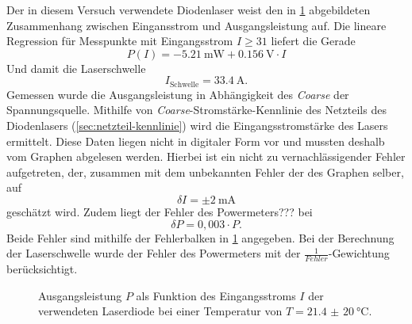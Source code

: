 \documentclass[../bericht.tex]{subfiles}
\begin{document}
      Der in diesem Versuch verwendete Diodenlaser weist den in \cref{fig:laserschwelle} abgebildeten Zusammenhang zwischen Eingansstrom und Ausgangsleistung auf. Die lineare Regression für Messpunkte mit Eingangsstrom $I\ge 31$ liefert die Gerade
      \begin{equation*}
        P(I)=-\SI{5,21}{\milli\watt} + \SI{0,156}{\volt}\cdot I
      \end{equation*}
      Und damit die Laserschwelle
      \begin{equation*}
        I_\mathrm{Schwelle}=\SI{33,4}{\ampere}.
      \end{equation*}
      Gemessen wurde die Ausgangsleistung in Abhängigkeit des \textit{Coarse} der Spannungsquelle. Mithilfe von \textit{Coarse}-Stromstärke-Kennlinie des Netzteils des Diodenlasers (\cref{sec:netzteil-kennlinie}) wird die Eingangsstromstärke des Lasers ermittelt. Diese Daten liegen nicht in digitaler Form vor und mussten deshalb vom Graphen abgelesen werden. Hierbei ist ein nicht zu vernachlässigender Fehler aufgetreten, der, zusammen mit dem unbekannten Fehler der des Graphen selber, auf
      \begin{equation*}
        \delta I = \pm \SI{2}{\milli\ampere}
      \end{equation*}
      geschätzt wird. Zudem liegt der Fehler des Powermeters??? bei
      \begin{equation*}
        \delta P = 0,003 \cdot P.
      \end{equation*}
      Beide Fehler sind mithilfe der Fehlerbalken in \cref{fig:laserschwelle} angegeben. Bei der Berechnung der Laserschwelle wurde der Fehler des Powermeters mit der $\frac{1}{Fehler}$-Gewichtung berücksichtigt.

      \begin{figure}[tb]
        \caption{Ausgangsleistung $P$ als Funktion des Eingangsstroms $I$ der verwendeten Laserdiode bei einer Temperatur von $T=\SI{21,4(20)}{\celsius}$.}
        \label{fig:laserschwelle}
      \end{figure}
\end{document}
